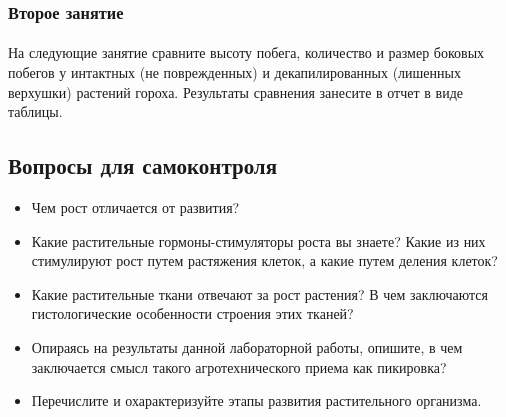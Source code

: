 	\subsubsection*{Второе занятие}
	
	\paragraph*{}На следующие занятие сравните высоту побега, количество и размер боковых побегов у интактных (не поврежденных) и декапилированных (лишенных верхушки) растений гороха. Результаты сравнения занесите в отчет в виде таблицы.
	
\subsection*{Вопросы для самоконтроля}

\begin{itemize}
	\item Чем рост отличается от развития?
	\item Какие растительные гормоны-стимуляторы роста вы знаете? Какие из них стимулируют рост путем растяжения клеток, а какие путем деления клеток?
	\item Какие растительные ткани отвечают за рост растения? В чем заключаются гистологические особенности строения этих тканей?
	\item Опираясь на результаты данной лабораторной работы, опишите, в чем заключается смысл такого агротехнического приема как пикировка?
	\item Перечислите и охарактеризуйте этапы развития растительного организма.
\end{itemize}
	



